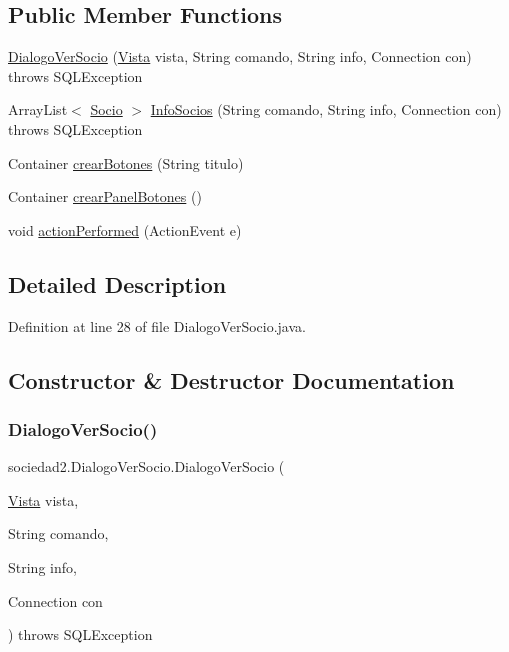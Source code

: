 \subsection*{Public Member Functions}
\begin{DoxyCompactItemize}
\item 
\mbox{\hyperlink{classsociedad2_1_1_dialogo_ver_socio_ab4314628e90ec29d1985716a5e1cecda}{Dialogo\+Ver\+Socio}} (\mbox{\hyperlink{classsociedad2_1_1_vista}{Vista}} vista, String comando, String info, Connection con)  throws S\+Q\+L\+Exception 
\item 
Array\+List$<$ \mbox{\hyperlink{classsociedad2_1_1_socio}{Socio}} $>$ \mbox{\hyperlink{classsociedad2_1_1_dialogo_ver_socio_aa6ecfb71916851860dd14056bc201f11}{Info\+Socios}} (String comando, String info, Connection con)  throws S\+Q\+L\+Exception 
\item 
Container \mbox{\hyperlink{classsociedad2_1_1_dialogo_ver_socio_ac6fc8788c34fb7f99282d5aa6ff43a4d}{crear\+Botones}} (String titulo)
\item 
Container \mbox{\hyperlink{classsociedad2_1_1_dialogo_ver_socio_a7ee9729c4602fe14eda688a29d56a28f}{crear\+Panel\+Botones}} ()
\item 
void \mbox{\hyperlink{classsociedad2_1_1_dialogo_ver_socio_a0e948f9ccbacd50e3464bd87fd13b82d}{action\+Performed}} (Action\+Event e)
\end{DoxyCompactItemize}


\subsection{Detailed Description}


Definition at line 28 of file Dialogo\+Ver\+Socio.\+java.



\subsection{Constructor \& Destructor Documentation}
\mbox{\label{classsociedad2_1_1_dialogo_ver_socio_ab4314628e90ec29d1985716a5e1cecda}} 
\subsubsection{\texorpdfstring{Dialogo\+Ver\+Socio()}{DialogoVerSocio()}}
{\footnotesize\ttfamily sociedad2.\+Dialogo\+Ver\+Socio.\+Dialogo\+Ver\+Socio (\begin{DoxyParamCaption}\item[{\mbox{\hyperlink{classsociedad2_1_1_vista}{Vista}}}]{vista,  }\item[{String}]{comando,  }\item[{String}]{info,  }\item[{Connection}]{con }\end{DoxyParamCaption}) throws S\+Q\+L\+Exception}



